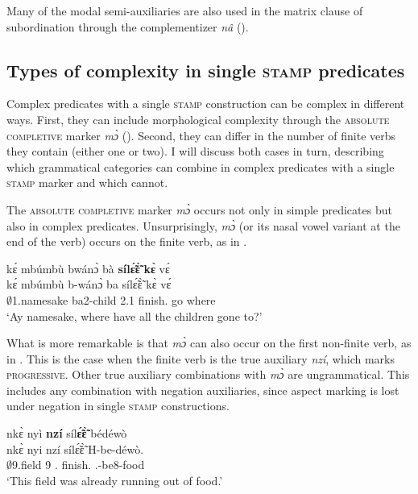 \noindent Many of the modal semi-auxiliaries are also used in the matrix clause of subordination through the complementizer {\itshape nâ} ().



\subsection{Types of complexity in single \textsc{stamp} predicates}
\label{sec:ComplMulti}

Complex predicates with a single \textsc{stamp} construction can be complex in different ways. First, they can include morphological complexity through the \textsc{absolute completive} marker {\itshape mɔ̀} (). Second, they can differ in the number of finite verbs they contain (either one or two).  I will discuss both cases in turn, describing which grammatical categories can combine in complex predicates with a single \textsc{stamp} marker and which cannot.

The \textsc{absolute completive} marker {\itshape mɔ̀} occurs not only in simple predicates but also  in complex predicates. Unsurprisingly, {\itshape mɔ̀} (or its nasal vowel variant at the end of the verb) occurs on the finite verb, as in .

\ea\label{AUXas2}
  \glll kɛ́ mbúmbù bwánɔ̀ bà {\bfseries sílɛ̃́ɛ̃̀} {\bfseries kɛ̀} vɛ́ \\
       kɛ́ mbúmbù b-wánɔ̀ ba sílɛ̃́ɛ̃̀ kɛ̀ vɛ́ \\
        {\EXCL} $\emptyset$1.namesake ba2-child 2.{\PST}1 finish.{\COMPL} go where\\
    \trans `Ay namesake, where have all the children gone to?'
\z

\noindent What is more remarkable is that {\itshape mɔ̀} can also occur on the first non-finite verb, as in . This is the case when the finite verb is the true auxiliary {\itshape nzí}, which marks \textsc{progressive}. Other true auxiliary combinations with {\itshape mɔ̀} are ungrammatical. This includes any combination with negation auxiliaries, since aspect marking is lost under negation in single \textsc{stamp} constructions.

\ea\label{nzicompl}
  \glll nkɛ̀ nyì {\bfseries nzí} síl{\bfseries ɛ̃́ɛ̃̀} bédéwò \\
          nkɛ̀ nyi nzí sílɛ̃́ɛ̃̀ H-be-déwò. \\
          $\emptyset$9.field 9 {\PROG}.{\PST} finish.{\COMPL} {\OBJ}.{\LINK}-be8-food\\
    \trans `This field was already running out of food.'
\z


